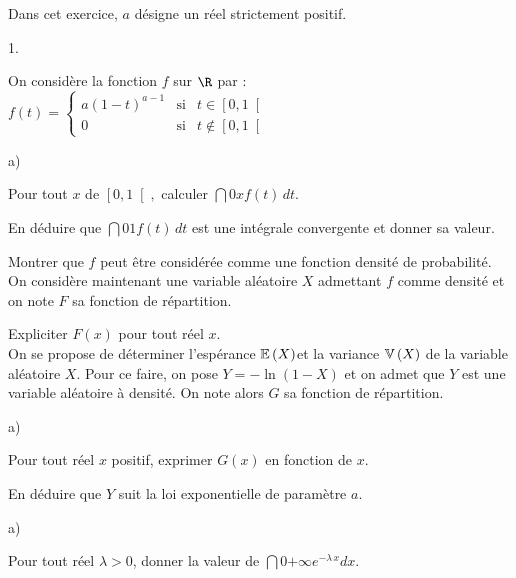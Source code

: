\documentclass[11pt]{article}%
\begin{document}
Dans cet exercice, $a$ désigne un réel strictement positif.

\begin{noliste}{1.}
 \setlength{\itemsep}{4mm}
\item On considère la fonction $f$ sur $\R$ par : $f\left( t\right)
 = \left\{ 
\begin{array}{ccc}
a\left( 1-t\right) ^{a-1} & \text{si} & t\in \left[ 0,1\right[ \\
0 & \text{si} & t\notin \left[ 0,1\right[ 
\end{array}
\right. $

\begin{noliste}{a)}
 \setlength{\itemsep}{2mm}
\item Pour tout $x$ de $\left[ 0,1\right[,$ calculer $\dint{0}{x}f
\left( t\right) \,dt$.

\item En déduire que $\dint{0}{1}f\left( t\right) \,dt$ est une
intégrale convergente et donner sa valeur.

\item Montrer que $f$ peut être considérée comme une fonction densité
de
probabilité.\\
On considère maintenant une variable aléatoire $X$ admettant $f$ comme
densité et on note $F$ sa fonction de répartition.
\end{noliste}

\item Expliciter $F(x)$ pour tout réel $x$.\\
On se propose de déterminer l'espérance $\mathbb{E}\left( X\right) $et la
variance $
\mathbb{V}\left( X\right) $ de la variable aléatoire $X$. Pour ce faire, on
pose $
Y = -\ln \left( 1-X\right) $ et on admet que $Y$ est une variable
aléatoire à
densité. On note alors $G$ sa fonction de répartition.

\item 

\begin{noliste}{a)}
 \setlength{\itemsep}{2mm}
\item Pour tout réel $x$ positif, exprimer $G\left( x\right) $ en
fonction
de $x.$

\item En déduire que $Y$ suit la loi exponentielle de paramètre $a$.
\end{noliste}

\item 

\begin{noliste}{a)}
 \setlength{\itemsep}{2mm}
\item Pour tout réel $\lambda >0$, donner la valeur de $\dint{0}{+
\infty }e^{-\lambda \,x}dx$.


\end{noliste}
\end{noliste}
\end{document}
